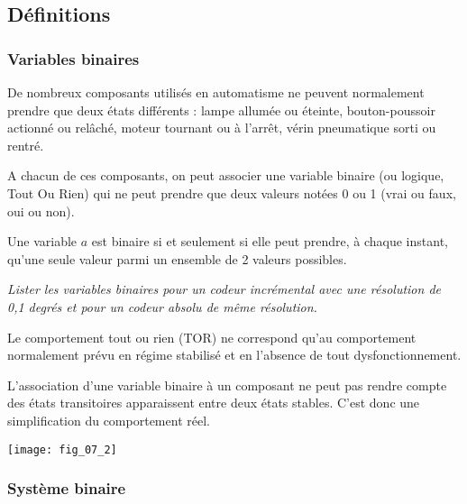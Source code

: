 \subsection{Définitions}
\subsubsection{Variables binaires}
De nombreux composants utilisés en automatisme ne peuvent normalement prendre que deux états différents : lampe allumée ou éteinte, bouton-poussoir actionné ou relâché, moteur tournant ou à l'arrêt, vérin pneumatique sorti ou rentré. 


A chacun de ces composants, on peut associer une variable binaire (ou logique, Tout Ou Rien) qui ne peut prendre que deux valeurs notées 0 ou 1 (vrai ou faux, oui ou non). 

\begin{defi}
Une variable $a$ est binaire si et seulement si elle peut prendre, à chaque instant, qu'une seule valeur parmi un ensemble de 2 valeurs possibles. 
\end{defi}

\begin{exemple}
\textit{Lister les variables binaires pour un codeur incrémental avec une résolution de 0,1 degrés et pour un codeur absolu de même résolution.}
\end{exemple}


\begin{rem}
\begin{minipage}[c]{.6\linewidth}
Le comportement tout ou rien (TOR) ne correspond qu'au comportement normalement prévu en régime stabilisé et en l'absence de tout dysfonctionnement. 

L'association d'une variable binaire à un composant ne peut pas rendre compte des états transitoires apparaissent entre deux états stables. C'est donc une simplification du comportement réel.
\end{minipage}\hfill
\begin{minipage}[c]{.35\linewidth}
\begin{center}
\texttt{[image: fig\_07\_2]}
\end{center}
\end{minipage}
\end{rem}



\subsubsection{Système binaire}

